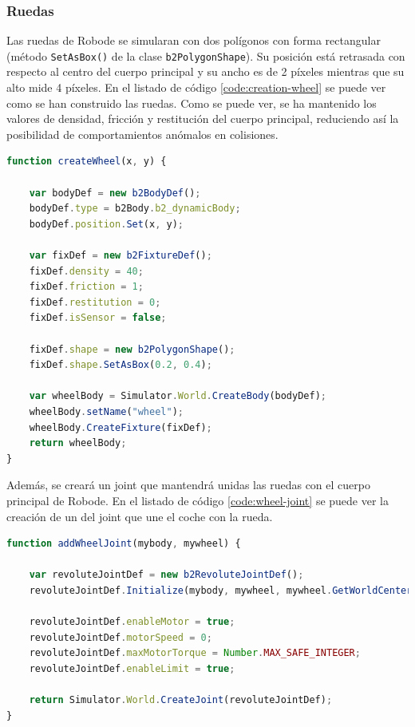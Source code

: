 \subsubsection*{Ruedas}

Las ruedas de Robode se simularan con dos polígonos con forma rectangular  (método \texttt{SetAsBox()} de la clase \texttt{b2PolygonShape}). Su posición está retrasada con respecto al centro del cuerpo principal y su ancho es de 2 píxeles mientras que su alto mide 4 píxeles. En el listado de código \ref{code:creation-wheel} se puede ver como se han construido las ruedas. Como se puede ver, se ha mantenido los valores de densidad, fricción y restitución del cuerpo principal, reduciendo así la posibilidad de comportamientos anómalos en colisiones.

\begin{lstlisting}[language={Javascript},label={code:creation-wheel}, caption={Función que crea las ruedas de Robode.}]
function createWheel(x, y) {

	var bodyDef = new b2BodyDef();
	bodyDef.type = b2Body.b2_dynamicBody;
	bodyDef.position.Set(x, y);
	
	var fixDef = new b2FixtureDef();
	fixDef.density = 40;
	fixDef.friction = 1;
	fixDef.restitution = 0;
	fixDef.isSensor = false;

	fixDef.shape = new b2PolygonShape();
	fixDef.shape.SetAsBox(0.2, 0.4);
	
	var wheelBody = Simulator.World.CreateBody(bodyDef);
	wheelBody.setName("wheel");
	wheelBody.CreateFixture(fixDef);
	return wheelBody;
}
\end{lstlisting}

Además, se creará un joint que mantendrá unidas las ruedas con el cuerpo principal de Robode. En el listado de código  \ref{code:wheel-joint} se puede ver la creación de un del joint que une el coche con la rueda.

\begin{lstlisting}[language={Javascript},label={code:wheel-joint}, caption={Función que crea el joint que une la rueda al coche.}]
function addWheelJoint(mybody, mywheel) {

	var revoluteJointDef = new b2RevoluteJointDef();
	revoluteJointDef.Initialize(mybody, mywheel, mywheel.GetWorldCenter());

	revoluteJointDef.enableMotor = true;
	revoluteJointDef.motorSpeed = 0;
	revoluteJointDef.maxMotorTorque = Number.MAX_SAFE_INTEGER;
	revoluteJointDef.enableLimit = true;

	return Simulator.World.CreateJoint(revoluteJointDef);
}
\end{lstlisting}


